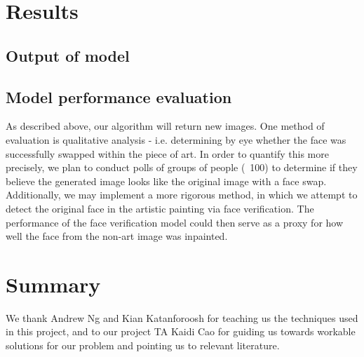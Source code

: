 \documentclass{pnastwo2}
\begin{document}
\begin{article}
\section{Results}

\subsection{Output of model}

\subsection{Model performance evaluation}

As described above, our algorithm will return new images. One method of evaluation is qualitative analysis - i.e. determining by eye whether the face was successfully swapped within the piece of art. In order to quantify this more precisely, we plan to conduct polls of groups of people (~100) to determine if they believe the generated image looks like the original image with a face swap. Additionally, we may implement a more rigorous method, in which we attempt to detect the original face in the artistic painting via face verification. The performance of the face verification model could then serve as a proxy for how well the face from the non-art image was inpainted.

\section{Summary}


\begin{acknowledgments}
We thank Andrew Ng and Kian Katanforoosh for teaching us the techniques used in this project, and to our project TA Kaidi Cao for guiding us towards workable solutions for our problem and pointing us to relevant literature.
\end{acknowledgments}




\end{article}
\end{document}
